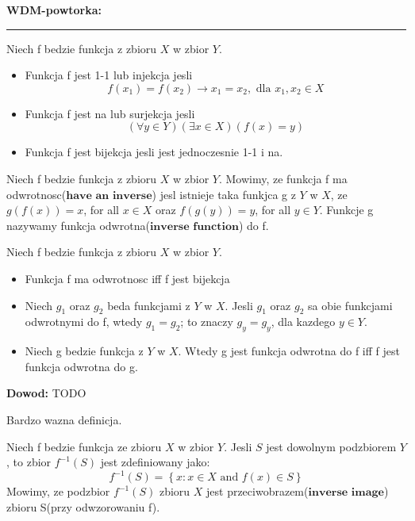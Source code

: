 \documentclass{article}
\begin{document}
\textbf{WDM-powtorka:}
\hrule

\begin{tcolorbox}[colback=white!90!red,colframe=black!35!red,title=1.3.4 Definicja: Funkcja injekcja/surjekcja/bijekcja]
    Niech f bedzie funkcja z zbioru $X$ w zbior $Y$.
    \begin{itemize}
        \item Funkcja f jest 1-1 lub injekcja jesli $$ f(x_{1}) = f(x_{2}) \rightarrow x_{1} = x_{2}, \text{ dla } x_{1},x_{2} \in X$$
        \item Funkcja f jest na lub surjekcja jesli $$ (\forall y \in Y)(\exists x \in X)(f(x) = y)$$
        \item Funkcja f jest bijekcja jesli jest jednoczesnie 1-1 i na.
    \end{itemize}
\end{tcolorbox}

\begin{tcolorbox}[colback=white!90!red,colframe=black!35!red,title=1.3.5 Definicja: Odwrotnosc funkcji.]

    Niech f bedzie funkcja z zbioru $X$ w zbior $Y$. Mowimy, ze funkcja f ma odwrotnosc($\textbf{have an inverse}$) jesl istnieje taka funkjca g z $Y$ w $X$, ze $g(f(x)) = x$, for all $x \in X$ oraz $f(g(y)) = y$, for all $y \in Y$. Funkcje g nazywamy funkcja odwrotna($\textbf{inverse function}$) do f. 
\end{tcolorbox}

\begin{tcolorbox}[colback=white!90!green,colframe=black!35!green,title=1.3.6 Lemat: Wlasnosci funkcji.]
    Niech f bedzie funkcja z zbioru $X$ w zbior $Y$.
    \begin{itemize}
        \item Funkcja f ma odwrotnosc iff f jest bijekcja
        \item Niech $g_{1}$ oraz $g_{2}$ beda funkcjami z $Y$ w $X$. Jesli $g_{1}$ oraz $g_{2}$ sa obie funkcjami odwrotnymi do f, wtedy $g_{1} = g_{2}$; to znaczy $g_{y} = g_{y}$, dla kazdego $y \in Y$.
        \item Niech  g bedzie funkcja z $Y$ w $X$. Wtedy g jest funkcja odwrotna do f iff f jest funkcja odwrotna do g.
    \end{itemize}
\end{tcolorbox}

\textbf{Dowod:} TODO

Bardzo wazna definicja.
\begin{tcolorbox}[colback=white!90!red,colframe=black!35!red,title=1.3.7 Definicja: Przeciwobraz funkcji]

    Niech f bedzie funkcja ze zbioru $X$ w zbior $Y$. Jesli $S$ jest dowolnym podzbiorem $Y$, to zbior $f^{-1}(S)$ jest zdefiniowany jako:
    $$f^{-1}(S) = \left\{ x: x \in X \text{ and } f(x) \in S \right\}$$
    Mowimy, ze podzbior $f^{-1}(S)$ zbioru $X$ jest przeciwobrazem($\textbf{inverse image}$) zbioru S(przy odwzorowaniu f).

\end{tcolorbox}
\end{document}
